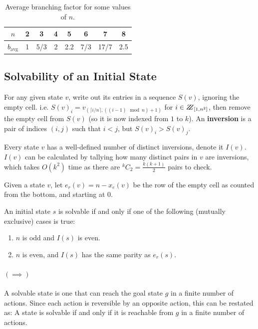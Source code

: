 \documentclass[runningheads]{llncs}
\begin{document}
\begin{table}[h]
\centering
\caption{Average branching factor for some values of $n$.}
\label{tab:results}
\begin{tabular}{|c||c|c|c|c|c|c|c|} \hline
$n$            & 2 & 3   & 4 & 5   & 6   &  7   & 8 \\ \hline
$b_\text{avg}$ & 1 & 5/3 & 2 & 2.2 & 7/3 & 17/7 & 2.5 \\ \hline
\end{tabular}
\end{table}

\subsection{Solvability of an Initial State \cite{Solvability}}
\label{subsec:solvability}
\begin{definition}\label{def:inversion}
For any given state $v$, write out its entries in a sequence $S(v)$, ignoring the empty cell. i.e. $S(v)_i = v_{(\lceil i/n\rceil, ((i-1) \mod n) +1)}$ for $i \in \bbbz_{[1,n^2]}$, then remove the empty cell from $S(v)$ (so it is now indexed from $1$ to $k$). An \textbf{inversion} is a pair of indices $(i,j)$ such that $i < j$, but $S(v)_i > S(v)_j$.
\end{definition}
Every state $v$ has a well-defined number of distinct inversions, denote it $I(v)$. $I(v)$ can be calculated by tallying how many distinct pairs in $v$ are inversions, which takes $O(k^2)$ time as there are $^kC_2 = \frac{k(k+1)}{2}$ pairs to check.

Given a state $v$, let $e_r(v) = n - x_e(v)$ be the row of the empty cell as counted from the bottom, and starting at 0.

\begin{theorem}\label{thm:solvability}
An initial state $s$ is solvable if and only if one of the following (mutually exclusive) cases is true:
\begin{enumerate}
\item $n$ is odd and $I(s)$ is even.
\item $n$ is even, and $I(s)$ has the same parity as $e_r(s)$.
\end{enumerate}
\end{theorem}
\paragraph{$(\implies)$}
A solvable state is one that can reach the goal state $g$ in a finite number of actions. Since each action is reversible by an opposite action, this can be restated as: A state is solvable if and only if it is reachable from $g$ in a finite number of actions.
\end{document}
